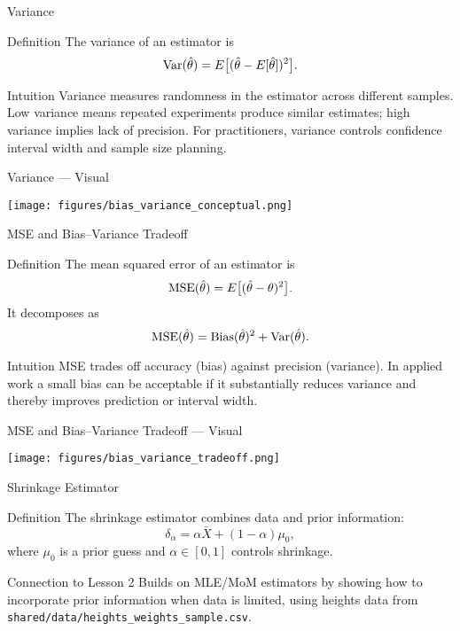 \begin{frame}{Variance}
  \begin{block}{Definition}
    The variance of an estimator is
    \[\operatorname{Var}(\hat{\theta}) = E\big[(\hat{\theta} - E[\hat{\theta}])^2\big].\]
  \end{block}

  \begin{block}{Intuition}
    Variance measures randomness in the estimator across different samples.
    Low variance means repeated experiments produce similar estimates; high
    variance implies lack of precision. For practitioners, variance controls
    confidence interval width and sample size planning.
  \end{block}
\end{frame}

\begin{frame}{Variance --- Visual}
  \begin{center}
    \texttt{[image: figures/bias\_variance\_conceptual.png]}
  \end{center}
\end{frame}

\begin{frame}{MSE and Bias--Variance Tradeoff}
  \begin{block}{Definition}
    The mean squared error of an estimator is
    \[\operatorname{MSE}(\hat{\theta}) = E\big[(\hat{\theta} - \theta)^2\big].\]
    It decomposes as
    \[\operatorname{MSE}(\hat{\theta}) = \operatorname{Bias}(\hat{\theta})^2 + \operatorname{Var}(\hat{\theta}).\]
  \end{block}

  \begin{block}{Intuition}
    MSE trades off accuracy (bias) against precision (variance). In applied work
    a small bias can be acceptable if it substantially reduces variance and
    thereby improves prediction or interval width.
  \end{block}
\end{frame}

\begin{frame}{MSE and Bias--Variance Tradeoff --- Visual}
  \begin{center}
    \texttt{[image: figures/bias\_variance\_tradeoff.png]}
  \end{center}
\end{frame}

\begin{frame}{Shrinkage Estimator}
  \begin{block}{Definition}
    The shrinkage estimator combines data and prior information:
    \[\delta_\alpha = \alpha \bar{X} + (1-\alpha) \mu_0,\]
    where $\mu_0$ is a prior guess and $\alpha \in [0,1]$ controls shrinkage.
  \end{block}

  \begin{block}{Connection to Lesson 2}
    Builds on MLE/MoM estimators by showing how to incorporate prior information
    when data is limited, using heights data from \texttt{shared/data/heights\_weights\_sample.csv}.
  \end{block}
\end{frame}


